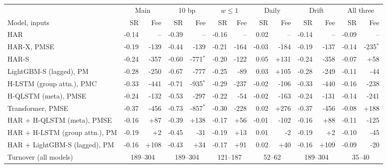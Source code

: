 \begin{tabular}{lrrrrrrrrrrrr}
\toprule
 & \multicolumn{2}{c}{Main} & \multicolumn{2}{c}{10 bp} & \multicolumn{2}{c}{$w\le1$} & \multicolumn{2}{c}{Daily} & \multicolumn{2}{c}{Drift} & \multicolumn{2}{c}{All three} \\
\cmidrule(lr){2-3}\cmidrule(lr){4-5}\cmidrule(lr){6-7}\cmidrule(lr){8-9}\cmidrule(lr){10-11}\cmidrule(lr){12-13}
Model, inputs & SR & Fee & SR & Fee & SR & Fee & SR & Fee & SR & Fee & SR & Fee \\
\midrule
HAR & -0.14 & -- & -0.39 & -- & -0.16 & -- & 0.02 & -- & -0.14 & -- & -0.09 & -- \\
HAR-X, PMSE & -0.19 & -139 & -0.44 & -139 & -0.21 & -164 & -0.03 & -184 & -0.19 & -137 & -0.14 & -235$^{*}$ \\
HAR-S & -0.24 & -357 & -0.60 & -771$^{*}$ & -0.20 & -122 & 0.05 & +131 & -0.24 & -358 & -0.07 & +58 \\
LightGBM-S (lagged), PM & -0.28 & -250 & -0.67 & -777 & -0.25 & -89 & 0.03 & +105 & -0.28 & -249 & -0.11 & -44 \\
H-LSTM (group attn.), PMC & -0.33 & -441 & -0.71 & -935$^{*}$ & -0.29 & -237 & -0.02 & -106 & -0.33 & -440 & -0.16 & -238 \\
H-QLSTM (meta), PMSE & -0.24 & -132 & -0.53 & -297 & -0.22 & -54 & -0.02 & -163 & -0.24 & -131 & -0.14 & -241 \\
Transformer, PMSE & -0.37 & -456 & -0.73 & -857$^{*}$ & -0.30 & -228 & 0.02 & +276 & -0.37 & -456 & -0.08 & +188 \\
\midrule
HAR + H-QLSTM (meta), PMSE & -0.16 & +87 & -0.39 & +138 & -0.17 & +56 & -0.01 & -102 & -0.16 & +88 & -0.11 & -125 \\
HAR + H-LSTM (group attn.), PM & -0.19 & +2 & -0.45 & -31 & -0.19 & +13 & 0.01 & -2 & -0.19 & +2 & -0.10 & -45 \\
HAR + LightGBM-S (lagged), PM & -0.16 & +108 & -0.43 & +34 & -0.17 & +91 & 0.02 & +40 & -0.16 & +109 & -0.09 & -20 \\
\midrule
Turnover (all models) & \multicolumn{2}{c}{189--304} & \multicolumn{2}{c}{189--304} & \multicolumn{2}{c}{121--187} & \multicolumn{2}{c}{52--62} & \multicolumn{2}{c}{189--304} & \multicolumn{2}{c}{35--40} \\
\bottomrule
\end{tabular}
